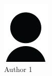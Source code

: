 \begin{figure}
    \centering
    \begin{subfigure}[b]{0.2\textwidth}
        \centering
        \includegraphics[width=\textwidth]{figs/author}
        \caption{Author 1}
        \label{fig:c1:auth1}
    \end{subfigure}
    \hfill
    \begin{subfigure}[b]{0.2\textwidth}
        \centering

\end{subfigure}
\end{figure}
